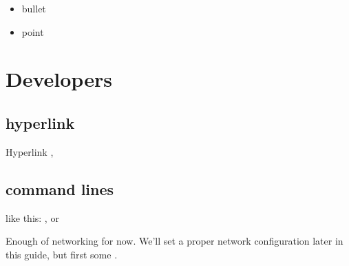 \documentclass[letterpaper,10pt,openany,oneside,english]{sphinxmanual}
\begin{document}
\sphinxAtStartPar
{}
\begin{itemize}
\item {} 
\sphinxAtStartPar
bullet

\item {} 
\sphinxAtStartPar
point

\end{itemize}


\chapter{Developers}
\label{\detokenize{developers:developers}}\label{\detokenize{developers::doc}}

\section{hyperlink}
\label{\detokenize{developers:hyperlink}}
\sphinxAtStartPar
Hyperlink ,


\section{command lines}
\label{\detokenize{developers:command-lines}}
\sphinxAtStartPar
like this: ,  or

\sphinxAtStartPar
Enough of networking for now. We’ll set a proper network configuration later in this guide, but first some .
\end{document}
